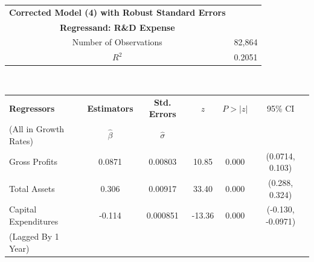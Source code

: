 \begin{table}[h]
\begin{tabular}{ c | c }
	\hline
	\textbf{Corrected Model (4) with Robust Standard Errors} \\
    \textbf{Regressand: R\&D Expense} \\
    \hline \hline
    Number of Observations & 82,864 \\
	\hline
    $R^{2}$ & 0.2051 \\
    \hline \hline
\end{tabular} \\

\begin{tabular}{ l | c | c | c | c | c }
	\hline
	\textbf{Regressors} & \textbf{Estimators} & \textbf{Std. Errors} & $z$ & $P > |z|$ & 95\% CI \\
    (All in Growth Rates) & $\hat{\beta}$ & $\hat{\sigma}$ & & & \\
    \hline \hline
	Gross Profits & 0.0871 & 0.00803  & 10.85 & 0.000 & (0.0714, 0.103) \\
	\hline
    Total Assets & 0.306 & 0.00917 & 33.40 & 0.000 & (0.288, 0.324)\\
    \hline
    Capital Expenditures & -0.114 & 0.000851 & -13.36 & 0.000 & (-0.130, -0.0971) \\
    (Lagged By 1 Year) & & & & & \\
    \hline \hline
\end{tabular}
\end{table}

\